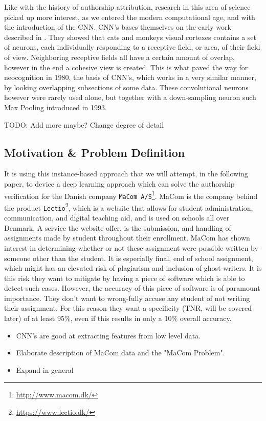 Like with the history of authorship attribution, research in this area of
science picked up more interest, as we entered the modern computational age,
and with the introduction of the \gls{CNN}. \gls{CNN}'s bases themselves on
the early work described in \cite{TJP:TJP19681951215}. They showed that cats
and monkeys visual cortexes contains a set of neurons, each individually
responding to a receptive field, or area, of their field of view. Neighboring
receptive fields all have a certain amount of overlap, however in the end
a cohesive view is created. This is what paved the way for neocognition
in 1980\cite{Fukushima1980}, the basis of \gls{CNN}'s, which works in a
very similar manner, by looking overlapping subsections of some data. These
convolutional neurons however were rarely used alone, but together with a
down-sampling neuron such Max Pooling introduced in 1993.\cite{Schmidhuber:2015}

TODO: Add more maybe? Change degree of detail


\subsection{Motivation \& Problem Definition} 

It is using this instance-based approach that we will attempt, in
the following paper, to device a deep learning approach which can
solve the authorship verification for the Danish company \texttt{MaCom
A/S}\footnote{\url{http://www.macom.dk/}}. MaCom is the company behind the
product \texttt{Lectio}\footnote{\url{https://www.lectio.dk/}}, which is a
website that allows for student administration, communication, and digital
teaching aid, and is used on schools all over Denmark. A service the website
offer, is the submission, and handling of assignments made by student throughout
their enrollment. MaCom has shown interest in determining whether or not these
assignment were possible written by someone other than the student. It is
especially final, end of school assignment, which might has an elevated risk of
plagiarism and inclusion of ghost-writers. It is this risk they want to mitigate
by having a piece of software which is able to detect such cases. However, the
accuracy of this piece of software is of paramount importance. They don't want
to wrong-fully accuse any student of not writing their assignment. For this
reason they want a specificity (\gls{TNR}, will be covered later) of at least
95\%, even if this results in only a 10\% overall accuracy.

\begin{itemize}
    \item CNN's are good at extracting features from low level data.
    \item Elaborate description of MaCom data and the "MaCom Problem".
    \item Expand in general
\end{itemize}
